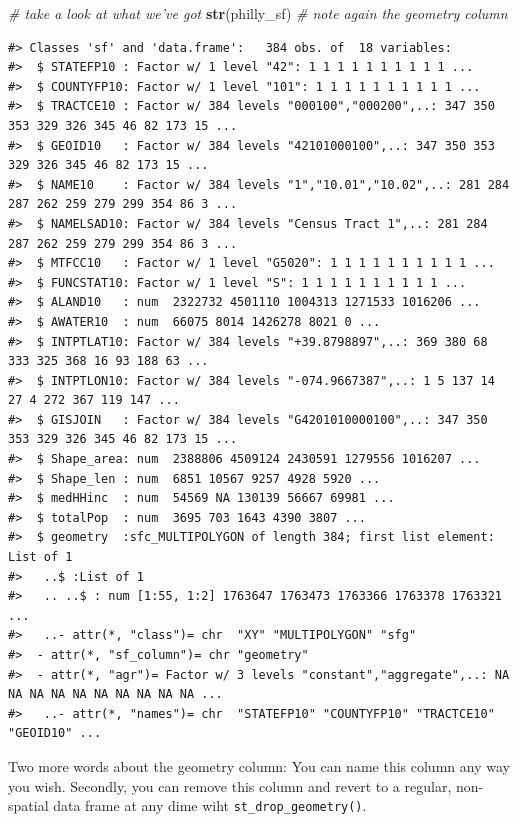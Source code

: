 \documentclass[]{book}
\newenvironment{Shaded}{\begin{snugshade}}{\end{snugshade}}
\newcommand{\KeywordTok}[1]{\textcolor[rgb]{0.13,0.29,0.53}{\textbf{#1}}}
\newcommand{\CommentTok}[1]{\textcolor[rgb]{0.56,0.35,0.01}{\textit{#1}}}
\newcommand{\NormalTok}[1]{#1}
\begin{document}
\begin{Shaded}
\begin{Highlighting}[]
\CommentTok{# take a look at what we've got}
\KeywordTok{str}\NormalTok{(philly_sf) }\CommentTok{# note again the geometry column}
\end{Highlighting}
\end{Shaded}

\begin{verbatim}
#> Classes 'sf' and 'data.frame':   384 obs. of  18 variables:
#>  $ STATEFP10 : Factor w/ 1 level "42": 1 1 1 1 1 1 1 1 1 1 ...
#>  $ COUNTYFP10: Factor w/ 1 level "101": 1 1 1 1 1 1 1 1 1 1 ...
#>  $ TRACTCE10 : Factor w/ 384 levels "000100","000200",..: 347 350 353 329 326 345 46 82 173 15 ...
#>  $ GEOID10   : Factor w/ 384 levels "42101000100",..: 347 350 353 329 326 345 46 82 173 15 ...
#>  $ NAME10    : Factor w/ 384 levels "1","10.01","10.02",..: 281 284 287 262 259 279 299 354 86 3 ...
#>  $ NAMELSAD10: Factor w/ 384 levels "Census Tract 1",..: 281 284 287 262 259 279 299 354 86 3 ...
#>  $ MTFCC10   : Factor w/ 1 level "G5020": 1 1 1 1 1 1 1 1 1 1 ...
#>  $ FUNCSTAT10: Factor w/ 1 level "S": 1 1 1 1 1 1 1 1 1 1 ...
#>  $ ALAND10   : num  2322732 4501110 1004313 1271533 1016206 ...
#>  $ AWATER10  : num  66075 8014 1426278 8021 0 ...
#>  $ INTPTLAT10: Factor w/ 384 levels "+39.8798897",..: 369 380 68 333 325 368 16 93 188 63 ...
#>  $ INTPTLON10: Factor w/ 384 levels "-074.9667387",..: 1 5 137 14 27 4 272 367 119 147 ...
#>  $ GISJOIN   : Factor w/ 384 levels "G4201010000100",..: 347 350 353 329 326 345 46 82 173 15 ...
#>  $ Shape_area: num  2388806 4509124 2430591 1279556 1016207 ...
#>  $ Shape_len : num  6851 10567 9257 4928 5920 ...
#>  $ medHHinc  : num  54569 NA 130139 56667 69981 ...
#>  $ totalPop  : num  3695 703 1643 4390 3807 ...
#>  $ geometry  :sfc_MULTIPOLYGON of length 384; first list element: List of 1
#>   ..$ :List of 1
#>   .. ..$ : num [1:55, 1:2] 1763647 1763473 1763366 1763378 1763321 ...
#>   ..- attr(*, "class")= chr  "XY" "MULTIPOLYGON" "sfg"
#>  - attr(*, "sf_column")= chr "geometry"
#>  - attr(*, "agr")= Factor w/ 3 levels "constant","aggregate",..: NA NA NA NA NA NA NA NA NA NA ...
#>   ..- attr(*, "names")= chr  "STATEFP10" "COUNTYFP10" "TRACTCE10" "GEOID10" ...
\end{verbatim}

Two more words about the geometry column: You can name this column any
way you wish. Secondly, you can remove this column and revert to a
regular, non-spatial data frame at any dime wiht
\texttt{st\_drop\_geometry()}.
\end{document}
